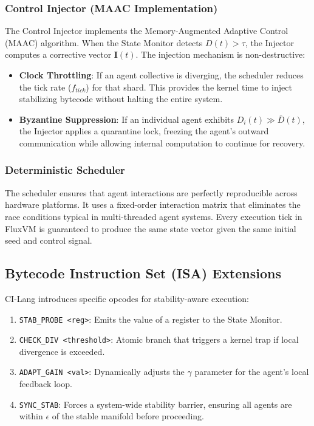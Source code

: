 \documentclass{article}
\begin{document}
\subsubsection{Control Injector (MAAC Implementation)}
The Control Injector implements the Memory-Augmented Adaptive Control (MAAC) algorithm. When the State Monitor detects $D(t) > \tau$, the Injector computes a corrective vector $\mathbf{I}(t)$.
The injection mechanism is non-destructive:
\begin{itemize}
    \item \textbf{Clock Throttling}: If an agent collective is diverging, the scheduler reduces the tick rate ($f_{tick}$) for that shard. This provides the kernel time to inject stabilizing bytecode without halting the entire system.
    \item \textbf{Byzantine Suppression}: If an individual agent exhibits $D_i(t) \gg \bar{D}(t)$, the Injector applies a quarantine lock, freezing the agent's outward communication while allowing internal computation to continue for recovery.
\end{itemize}

\subsubsection{Deterministic Scheduler}
The scheduler ensures that agent interactions are perfectly reproducible across hardware platforms. It uses a fixed-order interaction matrix that eliminates the race conditions typical in multi-threaded agent systems. Every execution tick in FluxVM is guaranteed to produce the same state vector given the same initial seed and control signal.

\subsection{Bytecode Instruction Set (ISA) Extensions}
CI-Lang introduces specific opcodes for stability-aware execution:
\begin{enumerate}
    \item \texttt{STAB\_PROBE <reg>}: Emits the value of a register to the State Monitor.
    \item \texttt{CHECK\_DIV <threshold>}: Atomic branch that triggers a kernel trap if local divergence is exceeded.
    \item \texttt{ADAPT\_GAIN <val>}: Dynamically adjusts the $\gamma$ parameter for the agent's local feedback loop.
    \item \texttt{SYNC\_STAB}: Forces a system-wide stability barrier, ensuring all agents are within $\epsilon$ of the stable manifold before proceeding.
\end{enumerate}
\end{document}
